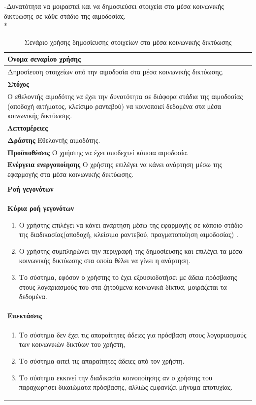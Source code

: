 -Δυνατότητα να μοιραστεί και να δημοσιεύσει στοιχεία στα μέσα κοινωνικής δικτύωσης σε κάθε στάδιο της αιμοδοσίας.
\\*
\begin{table}[H]	
	\begin{center}
	    \begin{tabular}{|p{\dimexpr \linewidth-2\tabcolsep}|}
	    \hline
	    \rowcolor{grayy}
	    \textbf{Όνομα σεναρίου χρήσης}
	    \\ \hline    
	    Δημοσίευση στοιχείων από την αιμοδοσία στα μέσα κοινωνικής δικτύωσης.
	     \\ \hline
	    \rowcolor{grayy}
	    \textbf{\textbf{Στόχος}}
	    \\ \hline
	 	 Ο εθελοντής αιμοδότης να έχει την δυνατότητα σε διάφορα στάδια της αιμοδοσίας (αποδοχή αιτήματος, κλείσιμο ραντεβού) να κοινοποιεί δεδομένα στα μέσα κοινωνικής δικτύωσης.
	    \\ \hline
	    \rowcolor{grayy}
	    \textbf{Λεπτομέρειες}
	    \\ \hline
		\textbf{Δράστης} Εθελοντής αιμοδότης.
		\\*
		\textbf{Προϋποθέσεις} Ο χρήστης να έχει αποδεχτεί κάποια αιμοδοσία.
		\\*
		\textbf{Ενέργεια ενεργοποίησης} Ο χρήστης επιλέγει να κάνει ανάρτηση μέσω της εφαρμογής στα μέσα κοινωνικής δικτύωσης.
		\\ \hline
	    \\ \hline
		\rowcolor{grayy}    
	    \textbf{Ροή γεγονότων}
	    \\* 
		\textbf{Κύρια ροή γεγονότων}
		\begin{enumerate}
		\item	 Ο χρήστης επιλέγει να κάνει ανάρτηση μέσω της εφαρμογής σε κάποιο στάδιο της διαδικασίας(αποδοχή, κλείσιμο ραντεβού, πραγματοποίηση αιμοδοσίας) .
		\item Ο χρήστης συμπληρώνει την περιγραφή της δημοσίευσης και επιλέγει τα μέσα κοινωνικής δικτύωσης στα οποία θέλει να γίνει η ανάρτηση.
	   \item Το σύστημα, εφόσον ο χρήστης το έχει εξουσιοδοτήσει με άδεια πρόσβασης στους λογαριασμούς του στα ζητούμενα κοινωνικά δίκτυα, μοιράζεται τα δεδομένα.
		\end{enumerate}
		\\*
		\textbf{Επεκτάσεις}
		   \\ \hline
		\begin{enumerate}
			\item Το σύστημα δεν έχει τις απαραίτητες άδειες για πρόσβαση στους λογαριασμούς των κοινωνικών δικτύων του χρήστη,
			\item Το σύστημα αιτεί τις απαραίτητες άδειες από τον χρήστη.
			\item Το σύστημα εκκινεί την διαδικασία κοινοποίησης αν ο χρήστης του παραχωρήσει δικαιώματα πρόσβασης, αλλιώς εμφανίζει μήνυμα αποτυχίας.
		\end{enumerate}
		\\ \hline
	    \end{tabular}
	    \caption{Σενάριο χρήσης δημοσίευσης στοιχείων στα μέσα κοινωνικής δικτύωσης}
	    \label{tab:share_to_social_media} 
	\end{center}
\end{table}		

